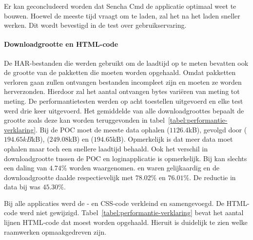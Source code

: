 Er kan geconcludeerd worden dat Sencha Cmd de applicatie optimaal weet te bouwen.
Hoewel \st{} de meeste tijd vraagt om te laden, zal het na het laden sneller werken.
Dit wordt bevestigd in de test over gebruikservaring.

\paragraph{Downloadgrootte en HTML-code}
De HAR-bestanden die werden gebruikt om de laadtijd op te meten bevatten ook de grootte van de pakketten die moeten worden opgehaald.
Omdat pakketten verloren gaan zullen ontvangen bestanden incompleet zijn en moeten ze worden herverzonden. %
Hierdoor zal het aantal ontvangen bytes variëren van meting tot meting.
De performantietesten werden op acht toestellen uitgevoerd en elke test werd drie keer uitgevoerd.
Het gemiddelde van alle downloadgroottes bepaalt de grootte zoals deze kan worden teruggevonden in tabel~\ref{tabel:performantie-verklaring}.
Bij de POC moet \st{} de meeste data ophalen ($1126.4$kB),  gevolgd door \kendo{} ($194.65kB$kB), \lungo{} ($249.08$kB) en \jqm{} ($194.65$kB).
Opmerkelijk is dat \lungo{} meer data moet ophalen maar toch een snellere laadtijd behaald.
Ook het verschil in downloadgrootte tussen de POC en loginapplicatie is opmerkelijk.
Bij \jqm{} kan slechts een daling van $4.74\%$ worden waargenomen.
\st{} en \lungo{} waren gelijkaardig en de downloadgrootte daalde respectievelijk met $78.02\%$ en $76.01\%$.
De reductie in data bij \kendo{} was $45.30\%$.

Bij alle applicaties werd de \js{}- en CSS-code verkleind en samengevoegd.
De HTML-code werd niet gewijzigd.
Tabel~\ref{tabel:performantie-verklaring} bevat het aantal lijnen HTML-code dat moest worden opgehaald.
Hieruit is duidelijk te zien welke raamwerken opmaakgedreven zijn.

\begin{table}[H]
\centering
{}
\caption{Metrieken gebruikt bij de verklaring van performantiecriterium voor \st{}~(\sta), \kendo{}~(\kendoa), \jqm{}~(\jqma) en \lungo{}~(\lungoa).}
\label{tabel:performantie-verklaring}
\end{table}


